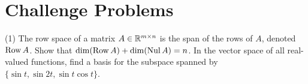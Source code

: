 \section{Challenge Problems}

\begin{tasks}[resume, style=enumerate](1)
\task
  The row space of a matrix $A \in \mathbb R^{m \times n}$ is the span of the
  rows of $A$, denoted $\operatorname{\mathrm{Row}} A$. Show that $\dim(\operatorname{\mathrm{Row}} A) + \dim(\operatorname{\mathrm{Nul}}
  A) = n$.
\task
  In the vector space of all real-valued functions, find a basis for
  the subspace spanned by $\{\sin t, \sin 2t, \sin t \cos t \}$.
\end{tasks}
